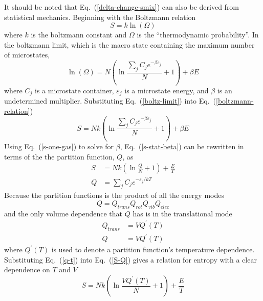\documentclass[a4paper]{article}
\newcommand{\eref}[1]{Eq.~(\ref{#1})}
\begin{document}
\begin{enumerate}
    It should be noted that \eref{delta-change-smix} can also be derived from
    statistical mechanics.  Beginning with the Boltzmann relation
    \begin{equation}
      S = k\ln(\Omega)
      \label{boltzmann-relation}
    \end{equation}
    where $k$ is the boltzmann constant and $\Omega$ is the ``thermodynamic
    probability''.  In the boltzmann limit, which is the macro state containing
    the maximum number of microstates,
    \begin{equation}
      \ln(\Omega) = N\left( \ln \frac{\sum\limits_{j}{C_j e^{-\beta\varepsilon_j}}}{N}
      + 1\right) + \beta E
      \label{boltz-limit}
    \end{equation}
    where $C_j$ is a microstate container, $\varepsilon_j$ is a microstate
    energy, and $\beta$ is an undetermined multiplier.  Substituting
    \eref{boltz-limit} into \eref{boltzmann-relation}
    \begin{equation}
      S = Nk\left( \ln \frac{\sum\limits_{j}{C_j e^{-\beta\varepsilon_j}}}{N}
      + 1\right) + \beta E
      \label{s-stat-beta}
    \end{equation}
    Using \eref{s-one-gas} to solve for $\beta$, \eref{s-stat-beta} can be
    rewritten in terms of the the partition function, $Q$, as
    \begin{align}
      S &= Nk\left( \ln\frac{Q}{N} + 1 \right) + \frac{E}{T} \\
      Q &= \sum\limits_{j}{C_j e^{-\varepsilon_j/kT}}
      \label{S-Q}
    \end{align}
    Because the partition functions is the product of all the energy modes
    \begin{equation}
      Q = Q_{trans}Q_{rot}Q_{vib}Q_{elec}
      \label{Q-def}
    \end{equation}
    and the only volume dependence that $Q$ has is in the translational mode
    \begin{align}
      Q_{trans} &= VQ^{'}(T) \label{q-trans} \\
      Q &= VQ^{'}(T) \label{q-t}
    \end{align}
    where $Q^{'}(T)$ is used to denote a partition function's temperature
    dependence.  Substituting \eref{q-t} into \eref{S-Q} gives a relation for
    entropy with a clear dependence on $T$ and $V$
    \begin{equation}
      S = Nk\left( \ln\frac{V Q^{'}(T)}{N} + 1 \right) + \frac{E}{T}
      \label{S-Q'}
    \end{equation}

\end{enumerate}
\end{document}
